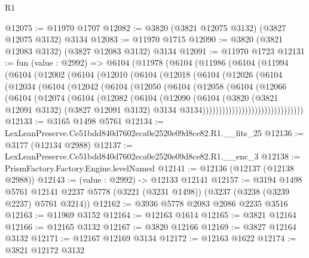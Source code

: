 \begin{lexlean}{R1}
\begin{coremodule}
@12075 := @11970 @1707
@12082 := @3820 (@3821 @12075 @3132) (@3827 @12075 @3132) @3134
@12083 := @11970 @1715
@12090 := @3820 (@3821 @12083 @3132) (@3827 @12083 @3132) @3134
@12091 := @11970 @1723
@12131 := fun (value : @2992) =>
  @6104
    (@11978
      (@6104
        (@11986
          (@6104
            (@11994
              (@6104
                (@12002
                  (@6104
                    (@12010
                      (@6104
                        (@12018
                          (@6104
                            (@12026
                              (@6104
                                (@12034
                                  (@6104
                                    (@12042
                                      (@6104
                                        (@12050
                                          (@6104
                                            (@12058
                                              (@6104
                                                (@12066
                                                  (@6104
                                                    (@12074
                                                      (@6104
                                                        (@12082
                                                          (@6104
                                                            (@12090
                                                              (@6104
                                                                (@3820
                                                                  (@3821 @12091 @3132)
                                                                  (@3827 @12091 @3132)
                                                                  @3134
                                                                  @3134)))))))))))))))))))))))))))))))
@12133 := @3165 @1498 @5761
@12134 := LexLeanPreserve.Ce51bdd840d7602eca0e2520e09d8ce82.R1.__fits_25
@12136 := @3177 (@12134 @2988)
@12137 := LexLeanPreserve.Ce51bdd840d7602eca0e2520e09d8ce82.R1.__enc_3
@12138 := PrismFactory.Factory.Engine.levelNamed
@12141 := @12136 (@12137 (@12138 @2988))
@12143 := (value : @2992) -> @12133 @12141
@12157 := @3194
    @1498
    @5761
    @12141
    @2237
    @5778
    (@3221 (@3231 @1498))
    (@3237 (@3238 (@3239 @2237) @5761 @3214))
@12162 := @3936 @5778 @2083 @2086 @2235 @3516
@12163 := @11969 @3152
@12164 := @12163 @1614
@12165 := @3821 @12164
@12166 := @12165 @3132
@12167 := @3820 @12166
@12169 := @3827 @12164 @3132
@12171 := @12167 @12169 @3134
@12172 := @12163 @1622
@12174 := @3821 @12172 @3132

\end{coremodule}
\end{lexlean}
